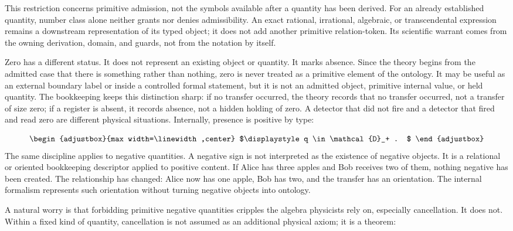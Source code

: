 This restriction concerns primitive admission, not the symbols available after a quantity has been derived. For an already established quantity, number class alone neither grants nor denies admissibility. An exact rational, irrational, algebraic, or transcendental expression remains a downstream representation of its typed object; it does not add another primitive relation-token. Its scientific warrant comes from the owning derivation, domain, and guards, not from the notation by itself.

Zero has a different status. It does not represent an existing object or quantity. It marks absence. Since the theory begins from the admitted case that there is something rather than nothing, zero is never treated as a primitive element of the ontology. It may be useful as an external boundary label or inside a controlled formal statement, but it is not an admitted object, primitive internal value, or held quantity. The bookkeeping keeps this distinction sharp: if no transfer occurred, the theory records that no transfer occurred, not a transfer of size zero; if a register is absent, it records absence, not a hidden holding of zero. A detector that did not fire and a detector that fired and read zero are different physical situations. Internally, presence is positive by type:

\begin{equation*}
\begin{adjustbox}{max width=\linewidth,center}
$\displaystyle
q \in \mathcal{D}_+ .
$
\end{adjustbox}
\end{equation*}
The same discipline applies to negative quantities. A negative sign is not interpreted as the existence of negative objects. It is a relational or oriented bookkeeping descriptor applied to positive content. If Alice has three apples and Bob receives two of them, nothing negative has been created. The relationship has changed: Alice now has one apple, Bob has two, and the transfer has an orientation. The internal formalism represents such orientation without turning negative objects into ontology.

A natural worry is that forbidding primitive negative quantities cripples the algebra physicists rely on, especially cancellation. It does not. Within a fixed kind of quantity, cancellation is not assumed as an additional physical axiom; it is a theorem:

